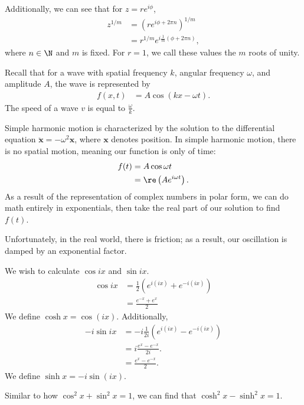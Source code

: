 \documentclass[10pt]{mypackage}
\begin{document}
Additionally, we can see that for $z = re^{i\phi}$,
\begin{align*}
  z^{1/m} &= \left(re^{i\phi + 2\pi n}\right)^{1/m}\\
          &= r^{1/m}e^{i\frac{1}{m}\left(\phi + 2\pi n\right)},
\end{align*}
where $n\in \N$ and $m$ is fixed. For $r = 1$, we call these values the $m$ roots of unity.
\begin{example}
  Recall that for a wave with spatial frequency $k$, angular frequency $\omega$, and amplitude $A$, the wave is represented by
  \begin{align*}
    f(x,t) &= A\cos\left(kx - \omega t\right).
  \end{align*}
  The speed of a wave $v$ is equal to $\frac{\omega}{k}$.\newline

  Simple harmonic motion is characterized by the solution to the differential equation $\ddot{\mathbf{x}} = -\omega^2 \mathbf{x}$, where $\mathbf{x}$ denotes position. In simple harmonic motion, there is no spatial motion, meaning our function is only of time:
  \begin{align*}
    f(t) &= A\cos \omega t\\
         &= \re\left(Ae^{i\omega t}\right).
  \end{align*}
  As a result of the representation of complex numbers in polar form, we can do math entirely in exponentials, then take the real part of our solution to find $f(t)$.\newline

  Unfortunately, in the real world, there is friction; as a result, our oscillation is damped by an exponential factor.
\end{example}
\begin{example}
  We wish to calculate $\cos ix$ and $\sin ix$.
  \begin{align*}
    \cos ix &= \frac{1}{2}\left(e^{i\left(ix\right)} + e^{-i\left(ix\right)}\right)\\
            &= \frac{e^{-x} + e^{x}}{2}
  \end{align*}
  We define $\cosh x = \cos \left(ix\right)$. Additionally,
  \begin{align*}
    - i\sin ix &= -i\frac{1}{2i}\left(e^{i\left(ix\right)} - e^{-i\left(ix\right)}\right)\\
            &= i\frac{e^{x} - e^{-x}}{2i}.\\
            &= \frac{e^{x} - e^{-x}}{2}.
  \end{align*}
  We define $\sinh x = -i\sin\left(ix\right)$.\newline

  Similar to how $\cos^2 x + \sin^2 x = 1$, we can find that $\cosh^2 x - \sinh^2 x = 1$.
\end{example}
\end{document}
